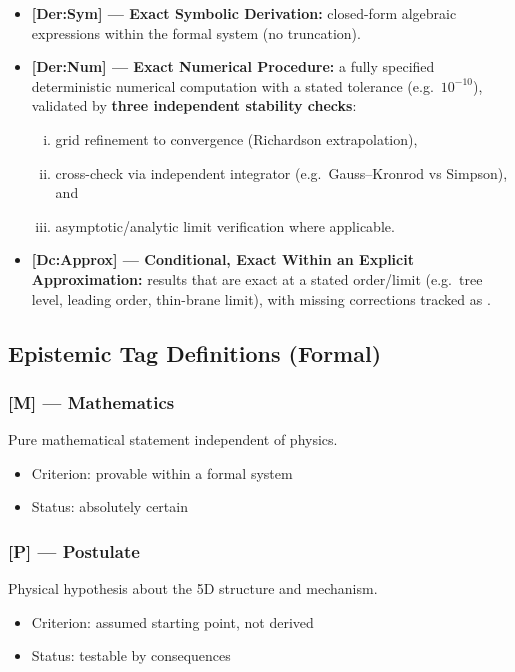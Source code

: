 \begin{itemize}
\item \textbf{[Der:Sym] --- Exact Symbolic Derivation:}
closed-form algebraic expressions within the formal system (no truncation).

\item \textbf{[Der:Num] --- Exact Numerical Procedure:}
a fully specified deterministic numerical computation with a stated tolerance (e.g.\ $10^{-10}$),
validated by \textbf{three independent stability checks}:
\begin{enumerate}[(i)]
\item grid refinement to convergence (Richardson extrapolation),
\item cross-check via independent integrator (e.g.\ Gauss--Kronrod vs Simpson), and
\item asymptotic/analytic limit verification where applicable.
\end{enumerate}

\item \textbf{[Dc:Approx] --- Conditional, Exact Within an Explicit Approximation:}
results that are exact at a stated order/limit (e.g.\ tree level, leading order, thin-brane limit),
with missing corrections tracked as \tagOpen{}.
\end{itemize}

\subsection*{Epistemic Tag Definitions (Formal)}

\subsubsection*{[M] --- Mathematics}
Pure mathematical statement independent of physics.
\begin{itemize}
\item Criterion: provable within a formal system
\item Status: absolutely certain
\end{itemize}

\subsubsection*{[P] --- Postulate}
Physical hypothesis about the 5D structure and mechanism.
\begin{itemize}
\item Criterion: assumed starting point, not derived
\item Status: testable by consequences
\end{itemize}

